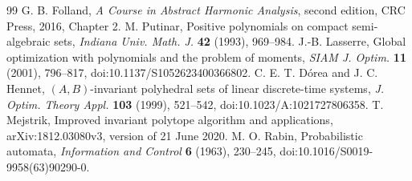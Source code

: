 \begin{thebibliography}{99}
 G. B. Folland,
\emph{A Course in Abstract Harmonic Analysis}, second edition,
CRC Press, 2016, Chapter 2.
 M. Putinar,
Positive polynomials on compact semi-algebraic sets,
\emph{Indiana Univ. Math. J.} \textbf{42} (1993), 969--984.
 J.-B. Lasserre,
Global optimization with polynomials and the problem of moments,
\emph{SIAM J. Optim.} \textbf{11} (2001), 796--817,
doi:10.1137/S1052623400366802.
 C. E. T. D\'orea and J. C. Hennet,
$(A,B)$-invariant polyhedral sets of linear discrete-time systems,
\emph{J. Optim. Theory Appl.} \textbf{103} (1999), 521--542,
doi:10.1023/A:1021727806358.
 T. Mejstrik,
Improved invariant polytope algorithm and applications,
arXiv:1812.03080v3, version of 21 June 2020.
 M. O. Rabin,
Probabilistic automata,
\emph{Information and Control} \textbf{6} (1963), 230--245,
doi:10.1016/S0019-9958(63)90290-0.
\end{thebibliography}
